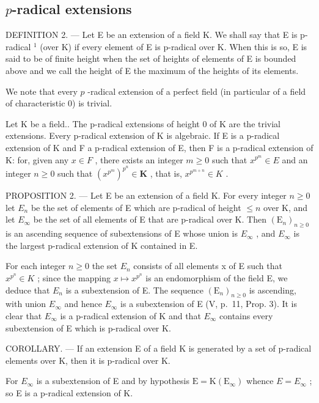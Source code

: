 \subsection{\texorpdfstring{\(p\)-radical extensions}{p-radical extensions}}

DEFINITION 2. --- Let E be an extension of a field K. We shall say that E is p-radical \(^{1}\) (over K) if every element of E is p-radical over K. When this is so, E is said to be of finite height when the set of heights of elements of E is bounded above and we call the height of E the maximum of the heights of its elements.

We note that every \(p\) -radical extension of a perfect field (in particular of a field of characteristic 0) is trivial.

Let K be a field.. The p-radical extensions of height 0 of K are the trivial extensions. Every p-radical extension of K is algebraic. If E is a p-radical extension of K and F a p-radical extension of E, then F is a p-radical extension of K: for, given any \(x \in F\) , there exists an integer \(m \geqslant 0\) such that \(x^{p^{m}} \in E\) and an integer \(n \geqslant 0\) such that \((x^{p^{m}})^{p^{n}} \in \mathbf{K}\) , that is, \(x^{p^{m+n}} \in K\) .

PROPOSITION 2. --- Let E be an extension of a field K. For every integer \(n \geqslant 0\) let \(E_{n}\) be the set of elements of E which are p-radical of height \(\leqslant n\) over K, and let \(E_{\infty}\) be the set of all elements of E that are p-radical over K. Then \((\mathrm{E}_{n})_{n \geqslant 0}\) is an ascending sequence of subextensions of E whose union is \(E_{\infty}\) , and \(E_{\infty}\) is the largest p-radical extension of K contained in E.

For each integer \(n \geqslant 0\) the set \(E_{n}\) consists of all elements x of E such that \(x^{p^{n}} \in K\) ; since the mapping \(x \mapsto x^{p^{n}}\) is an endomorphism of the field E, we deduce that \(E_{n}\) is a subextension of E. The sequence \((\mathrm{E}_{n})_{n \geqslant 0}\) is ascending, with union \(E_{\infty}\) and hence \(E_{\infty}\) is a subextension of E (V, p.~11, Prop. 3). It is clear that \(E_{\infty}\) is a p-radical extension of K and that \(E_{\infty}\) contains every subextension of E which is p-radical over K.

COROLLARY. --- If an extension E of a field K is generated by a set of p-radical elements over K, then it is p-radical over K.

For \(E_{\infty}\) is a subextension of E and by hypothesis \(\mathrm{E} = \mathrm{K}(\mathrm{E}_{\infty})\) whence \(E = E_{\infty}\) ; so E is a p-radical extension of K.

